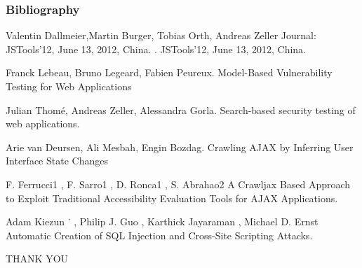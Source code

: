 \documentclass{beamer}
\begin{document}
\begin{frame}[allowframebreaks]
  \frametitle<presentation>{Bibliography}
    
  \begin{thebibliography}{10}
    

  Valentin Dallmeier,Martin Burger, Tobias Orth, Andreas Zeller Journal: JSTools'12, June 13, 2012, China.
    .
    \newblock JSTools'12, June 13, 2012, China.
 
    
  \beamertemplatearticlebibitems

    Franck Lebeau, Bruno Legeard, Fabien Peureux.
    \newblock Model-Based Vulnerability Testing for Web Applications
    
    Julian Thomé, Andreas Zeller, Alessandra Gorla.
    \newblock Search-based security testing of web applications.
  
  
    Arie van Deursen, Ali Mesbah, Engin Bozdag.
    \newblock Crawling AJAX by Inferring User Interface State Changes

     F. Ferrucci1 , F. Sarro1 , D. Ronca1 , S. Abrahao2
    \newblock A Crawljax Based Approach to Exploit Traditional Accessibility Evaluation Tools for AJAX Applications.
    
     Adam Kiezun ˙ , Philip J. Guo , Karthick Jayaraman , Michael D. Ernst 
    \newblock Automatic Creation of SQL Injection and Cross-Site Scripting Attacks.

  
  
  
  \end{thebibliography}
\end{frame}
\begin{frame}
\centering
\huge{THANK YOU}
\end{frame}
\end{document}

